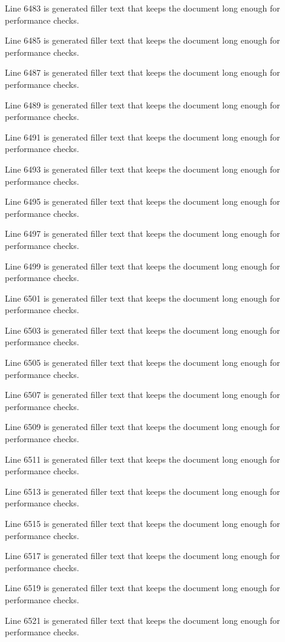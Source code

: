 Line 6483 is generated filler text that keeps the document long enough for performance checks.

Line 6485 is generated filler text that keeps the document long enough for performance checks.

Line 6487 is generated filler text that keeps the document long enough for performance checks.

Line 6489 is generated filler text that keeps the document long enough for performance checks.

Line 6491 is generated filler text that keeps the document long enough for performance checks.

Line 6493 is generated filler text that keeps the document long enough for performance checks.

Line 6495 is generated filler text that keeps the document long enough for performance checks.

Line 6497 is generated filler text that keeps the document long enough for performance checks.

Line 6499 is generated filler text that keeps the document long enough for performance checks.

Line 6501 is generated filler text that keeps the document long enough for performance checks.

Line 6503 is generated filler text that keeps the document long enough for performance checks.

Line 6505 is generated filler text that keeps the document long enough for performance checks.

Line 6507 is generated filler text that keeps the document long enough for performance checks.

Line 6509 is generated filler text that keeps the document long enough for performance checks.

Line 6511 is generated filler text that keeps the document long enough for performance checks.

Line 6513 is generated filler text that keeps the document long enough for performance checks.

Line 6515 is generated filler text that keeps the document long enough for performance checks.

Line 6517 is generated filler text that keeps the document long enough for performance checks.

Line 6519 is generated filler text that keeps the document long enough for performance checks.

Line 6521 is generated filler text that keeps the document long enough for performance checks.

